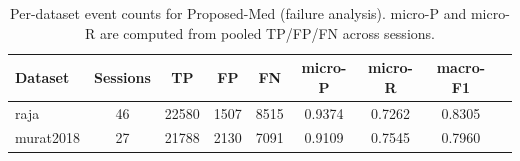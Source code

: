 \begin{table}[ht]
    \centering
    \caption{Per-dataset event counts for Proposed-Med (failure analysis).
        micro-P and micro-R are computed from pooled TP/FP/FN across sessions.}
    \label{tab:failure_analysis}
    \begin{tabular}{lcccccccc}
        \toprule
        Dataset & Sessions & TP & FP & FN & micro-P & micro-R & macro-F1 \\
        \midrule
        raja & 46 & 22580 & 1507 & 8515 & 0.9374 & 0.7262 & 0.8305 \\
        murat2018 & 27 & 21788 & 2130 & 7091 & 0.9109 & 0.7545 & 0.7960 \\
        \bottomrule
    \end{tabular}
\end{table}
